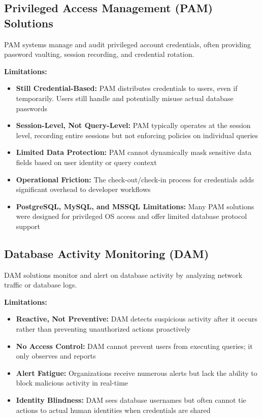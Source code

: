 \subsection{Privileged Access Management (PAM) Solutions}
PAM systems manage and audit privileged account credentials, often providing password vaulting, session recording, and credential rotation.

\textbf{Limitations:}
\begin{itemize}
    \item \textbf{Still Credential-Based:} PAM distributes credentials to users, even if temporarily. Users still handle and potentially misuse actual database passwords
    \item \textbf{Session-Level, Not Query-Level:} PAM typically operates at the session level, recording entire sessions but not enforcing policies on individual queries
    \item \textbf{Limited Data Protection:} PAM cannot dynamically mask sensitive data fields based on user identity or query context
    \item \textbf{Operational Friction:} The check-out/check-in process for credentials adds significant overhead to developer workflows
    \item \textbf{PostgreSQL, MySQL, and MSSQL Limitations:} Many PAM solutions were designed for privileged OS access and offer limited database protocol support
\end{itemize}

\subsection{Database Activity Monitoring (DAM)}
DAM solutions monitor and alert on database activity by analyzing network traffic or database logs.

\textbf{Limitations:}
\begin{itemize}
    \item \textbf{Reactive, Not Preventive:} DAM detects suspicious activity after it occurs rather than preventing unauthorized actions proactively
    \item \textbf{No Access Control:} DAM cannot prevent users from executing queries; it only observes and reports
    \item \textbf{Alert Fatigue:} Organizations receive numerous alerts but lack the ability to block malicious activity in real-time
    \item \textbf{Identity Blindness:} DAM sees database usernames but often cannot tie actions to actual human identities when credentials are shared
\end{itemize}

